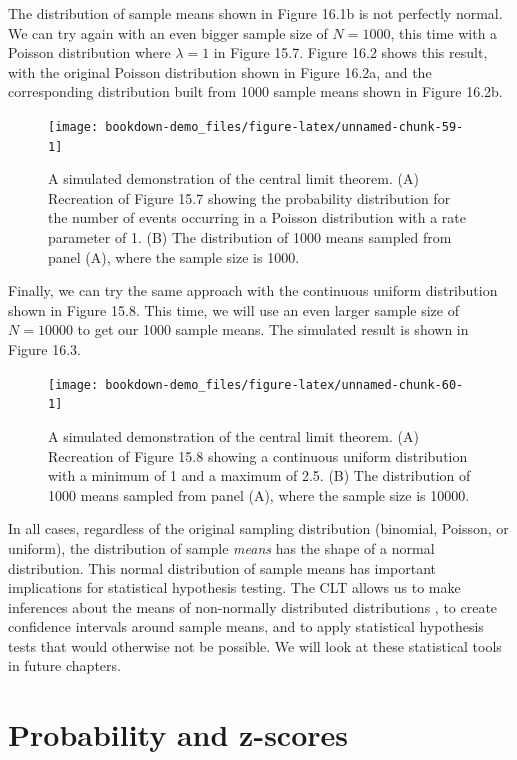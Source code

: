\documentclass[
  openany]{scrbook}
\begin{document}
The distribution of sample means shown in Figure 16.1b is not perfectly normal.
We can try again with an even bigger sample size of \(N = 1000\), this time with a Poisson distribution where \(\lambda = 1\) in Figure 15.7.
Figure 16.2 shows this result, with the original Poisson distribution shown in Figure 16.2a, and the corresponding distribution built from 1000 sample means shown in Figure 16.2b.

\begin{figure}
\texttt{[image: bookdown-demo\_files/figure-latex/unnamed-chunk-59-1]} \caption{A simulated demonstration of the central limit theorem. (A) Recreation of Figure 15.7 showing the probability distribution for the number of events occurring in a Poisson distribution with a rate parameter of 1. (B) The distribution of 1000 means sampled from panel (A), where the sample size is 1000.}\label{fig:unnamed-chunk-59}
\end{figure}

Finally, we can try the same approach with the continuous uniform distribution shown in Figure 15.8.
This time, we will use an even larger sample size of \(N = 10000\) to get our 1000 sample means.
The simulated result is shown in Figure 16.3.

\begin{figure}
\texttt{[image: bookdown-demo\_files/figure-latex/unnamed-chunk-60-1]} \caption{A simulated demonstration of the central limit theorem. (A) Recreation of Figure 15.8 showing a continuous uniform distribution with a minimum of 1 and a maximum of 2.5. (B) The distribution of 1000 means sampled from panel (A), where the sample size is 10000.}\label{fig:unnamed-chunk-60}
\end{figure}

In all cases, regardless of the original sampling distribution (binomial, Poisson, or uniform), the distribution of sample \emph{means} has the shape of a normal distribution.
This normal distribution of sample means has important implications for statistical hypothesis testing.
The CLT allows us to make inferences about the means of non-normally distributed distributions \citep{Sokal1995}, to create confidence intervals around sample means, and to apply statistical hypothesis tests that would otherwise not be possible.
We will look at these statistical tools in future chapters.

\hypertarget{probability-and-z-scores}{%
\section{Probability and z-scores}\label{probability-and-z-scores}}
\end{document}

